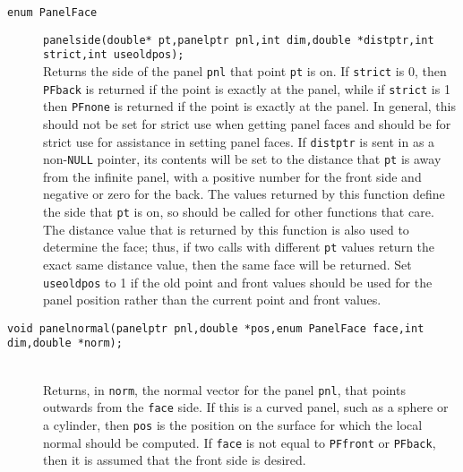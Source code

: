 \documentclass {scrbook}
\newcommand {\ttt} {\texttt}
\begin{document}
\begin{description}
\item[\ttt{enum PanelFace}]
\ttt{panelside(double* pt,panelptr pnl,int dim,double *distptr,int strict,int useoldpos);}
\hfill \\
Returns the side of the panel \ttt{pnl} that point \ttt{pt} is on. If \ttt{strict} is 0, then \ttt{PFback} is returned if the point is exactly at the panel, while if \ttt{strict} is 1 then \ttt{PFnone} is returned if the point is exactly at the panel. In general, this should not be set for strict use when getting panel faces and should be for strict use for assistance in setting panel faces. If \ttt{distptr} is sent in as a non-\ttt{NULL} pointer, its contents will be set to the distance that \ttt{pt} is away from the infinite panel, with a positive number for the front side and negative or zero for the back. The values returned by this function define the side that \ttt{pt} is on, so should be called for other functions that care. The distance value that is returned by this function is also used to determine the face; thus, if two calls with different \ttt{pt} values return the exact same distance value, then the same face will be returned. Set \ttt{useoldpos} to 1 if the old point and front values should be used for the panel position rather than the current point and front values.

\item[\ttt{void panelnormal(panelptr pnl,double *pos,enum PanelFace face,int dim,double *norm);}]
\hfill \\
Returns, in \ttt{norm}, the normal vector for the panel \ttt{pnl}, that points outwards from the \ttt{face} side. If this is a curved panel, such as a sphere or a cylinder, then \ttt{pos} is the position on the surface for which the local normal should be computed. If \ttt{face} is not equal to \ttt{PFfront} or \ttt{PFback}, then it is assumed that the front side is desired.


\end{description}
\end{document}
